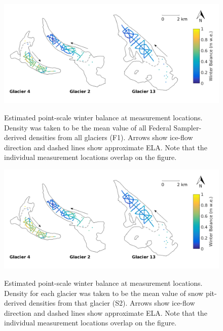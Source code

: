 \documentclass{sfuthesis}
\begin{document}
\begin{figure}
	\centering
	\includegraphics[width = \textwidth]{SWEmap_opt3.png}\\
	\caption{Estimated point-scale winter balance at measurement locations. Density was taken to be the mean value of all Federal Sampler-derived densities from all glaciers (F1). Arrows show ice-flow direction and dashed lines show approximate ELA. Note that the individual measurement locations overlap on the figure.}
	\label{fig:SWEmap_F1}
\end{figure}

\begin{figure}
	\centering
	\includegraphics[width =\textwidth]{SWEmap_opt4.png}\\
	\caption{Estimated point-scale winter balance at measurement locations. Density for each glacier was taken to be the mean value of snow pit-derived densities from that glacier (S2). Arrows show ice-flow direction and dashed lines show approximate ELA. Note that the individual measurement locations overlap on the figure.}
	\label{fig:SWEmap_S2}
\end{figure}
\end{document}
